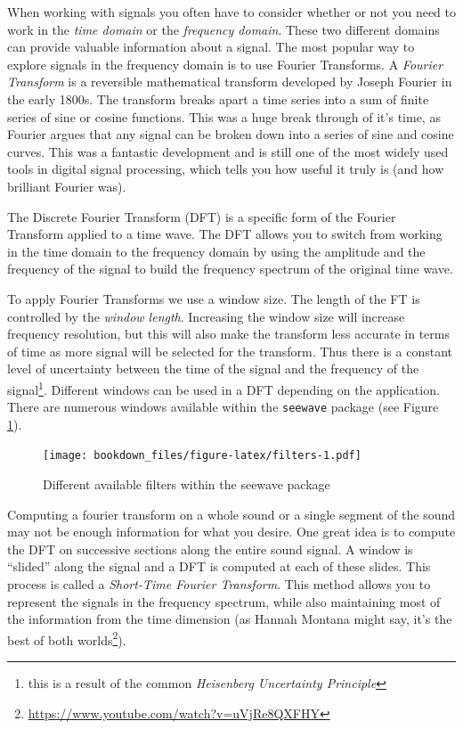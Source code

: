 \documentclass[]{krantz}
\renewcommand{\href}[2]{#2\footnote{\url{#1}}}
\begin{document}
When working with signals you often have to consider whether or not you
need to work in the \emph{time domain} or the \emph{frequency domain}.
These two different domains can provide valuable information about a
signal. The most popular way to explore signals in the frequency domain
is to use Fourier Transforms. A \emph{Fourier Transform} is a reversible
mathematical transform developed by Joseph Fourier in the early 1800s.
The transform breaks apart a time series into a sum of finite series of
sine or cosine functions. This was a huge break through of it's time, as
Fourier argues that any signal can be broken down into a series of sine
and cosine curves. This was a fantastic development and is still one of
the most widely used tools in digital signal processing, which tells you
how useful it truly is (and how brilliant Fourier was).

The Discrete Fourier Transform (DFT) is a specific form of the Fourier
Transform applied to a time wave. The DFT allows you to switch from
working in the time domain to the frequency domain by using the
amplitude and the frequency of the signal to build the frequency
spectrum of the original time wave.

To apply Fourier Transforms we use a window size. The length of the FT
is controlled by the \emph{window length}. Increasing the window size
will increase frequency resolution, but this will also make the
transform less accurate in terms of time as more signal will be selected
for the transform. Thus there is a constant level of uncertainty between
the time of the signal and the frequency of the signal\footnote{this is
  a result of the common \emph{Heisenberg Uncertainty Principle}}.
Different windows can be used in a DFT depending on the application.
There are numerous windows available within the \texttt{seewave} package
(see Figure \ref{fig:filters}).

\begin{figure}
\centering
\texttt{[image: bookdown\_files/figure-latex/filters-1.pdf]}
\caption{\label{fig:filters}Different available filters within the seewave
package}
\end{figure}

Computing a fourier transform on a whole sound or a single segment of
the sound may not be enough information for what you desire. One great
idea is to compute the DFT on successive sections along the entire sound
signal. A window is ``slided'' along the signal and a DFT is computed at
each of these slides. This process is called a \emph{Short-Time Fourier
Transform}. This method allows you to represent the signals in the
frequency spectrum, while also maintaining most of the information from
the time dimension (as Hannah Montana might say, it's the
\href{https://www.youtube.com/watch?v=uVjRe8QXFHY}{best of both
worlds}).
\end{document}
